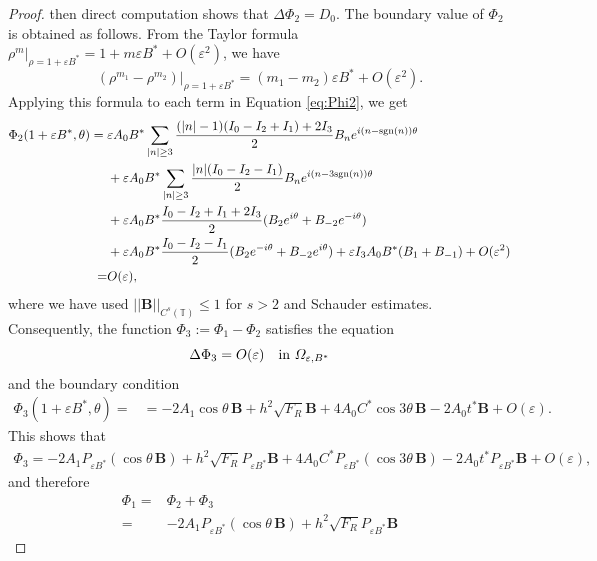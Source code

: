 \documentclass[10pt,a4paper]{amsart}
\begin{document}
\begin{proof}
then direct computation shows that $  \Delta\Phi_2=D_0. $ 
 The boundary value of $\Phi_2$ is obtained as follows. From the Taylor formula $ \rho^m\big|_{\rho=1+\varepsilon B^*}=1+m\varepsilon B^*+O(\varepsilon^2) $, we have 
 \begin{equation*} 
 (\rho^{m_1}-\rho^{m_2})\big|_{\rho=1+\varepsilon B^*}
 =(m_1-m_2)\varepsilon B^*+O(\varepsilon^2).
 \end{equation*}
 Applying this formula to each term in Equation \eqref{eq:Phi2}, we get
 \begin{align*}\label{eq:Phi2-boundary-expanded}
 \Phi_2(1+\varepsilon B^*,\theta)={}&\varepsilon A_0B^*\sum_{|n|\ge3}
 \frac{(|n|-1)(I_0-I_2+I_1)+2I_3}{2}B_n e^{i(n-\text{sgn} (n))\theta}\notag\\
 &+\varepsilon A_0B^*\sum_{|n|\ge3}
 \frac{|n|(I_0-I_2-I_1)}{2}B_n e^{i(n-3\text{sgn} (n))\theta}\notag\\
 &+\varepsilon A_0B^*\frac{I_0-I_2+I_1+2I_3}{2}(B_2e^{i\theta}+B_{-2}e^{-i\theta}) \notag\\
 &+\varepsilon A_0B^*\frac{I_0-I_2-I_1}{2}(B_2e^{-i\theta}+B_{-2}e^{i\theta})
 +\varepsilon I_3A_0B^*(B_1+B_{-1})+O(\varepsilon^2)\\
 =&O(\varepsilon),
 \end{align*}
where we have used   $ ||\textbf{B}||_{C^s(\mathbb{T})}\leq 1 $ for $ s>2 $ and Schauder estimates.
Consequently, the function $ \Phi_3:=\Phi_1-\Phi_2 $ satisfies the equation
\begin{equation*} 
\Delta\Phi_3=O(\varepsilon)\quad\hbox{in }\varOmega_{\varepsilon,B^*}
\end{equation*} 
and the boundary condition
 \begin{align*} 
 \Phi_3(1+\varepsilon B^*,\theta)=&=-2A_1 \cos\theta\, \textbf{B}+h^2\sqrt{F_R} \textbf{B}+4 A_0C^*\cos3\theta\, \textbf{B}-2 A_0 t^*\textbf{B}+O(\varepsilon).
 \end{align*}
 This shows that
 \begin{align*}%
 \Phi_3=-2A_1P_{\varepsilon B^*}(\cos\theta\, \textbf{B})
 +h^2\sqrt{F_R}P_{\varepsilon B^*}  \textbf{B}
 +4A_0C^*P_{\varepsilon B^*}(\cos3\theta\, \textbf{B})-2A_0t^*P_{\varepsilon B^*} \textbf{B}+O(\varepsilon),
 \end{align*}
and therefore
\begin{equation*} 
\begin{split}
\Phi_1=&\Phi_2+\Phi_3\\
=&-2A_1P_{\varepsilon B^*}(\cos\theta\, \textbf{B})
+h^2\sqrt{F_R}P_{\varepsilon B^*}  \textbf{B}

\end{split}
\end{equation*}
\end{proof}
\end{document}
